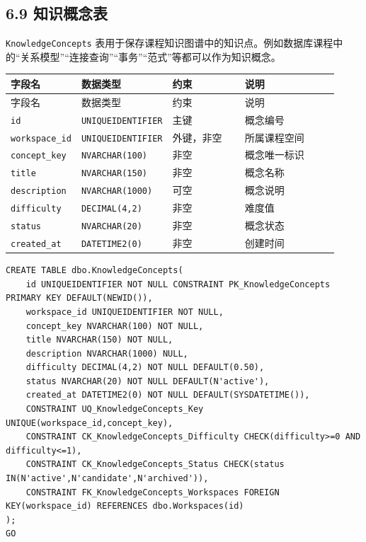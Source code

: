 \documentclass[10pt,a4paper,fontset=none]{ctexart}
\begin{document}
\subsection*{6.9 知识概念表}

\texttt{KnowledgeConcepts} 表用于保存课程知识图谱中的知识点。例如数据库课程中的“关系模型”“连接查询”“事务”“范式”等都可以作为知识概念。\par

\begingroup\scriptsize
\renewcommand{\arraystretch}{1.18}
\setlength{\LTleft}{0pt}
\setlength{\LTright}{0pt}
\begin{longtable}{>{\raggedright\arraybackslash}p{0.20\linewidth}>{\raggedright\arraybackslash}p{0.16\linewidth}>{\raggedright\arraybackslash}p{0.24\linewidth}>{\raggedright\arraybackslash}p{0.32\linewidth}}
\toprule
字段名 & 数据类型 & 约束 & 说明 \\
\midrule
\endfirsthead
\toprule
字段名 & 数据类型 & 约束 & 说明 \\
\midrule
\endhead
\texttt{id} & \texttt{UNIQUEIDENTIFIER} & 主键 & 概念编号 \\
\texttt{workspace\_id} & \texttt{UNIQUEIDENTIFIER} & 外键，非空 & 所属课程空间 \\
\texttt{concept\_key} & \texttt{NVARCHAR(100)} & 非空 & 概念唯一标识 \\
\texttt{title} & \texttt{NVARCHAR(150)} & 非空 & 概念名称 \\
\texttt{description} & \texttt{NVARCHAR(1000)} & 可空 & 概念说明 \\
\texttt{difficulty} & \texttt{DECIMAL(4,2)} & 非空 & 难度值 \\
\texttt{status} & \texttt{NVARCHAR(20)} & 非空 & 概念状态 \\
\texttt{created\_at} & \texttt{DATETIME2(0)} & 非空 & 创建时间 \\
\bottomrule
\end{longtable}
\endgroup


\begin{Verbatim}[fontsize=\scriptsize,frame=single]
CREATE TABLE dbo.KnowledgeConcepts(
    id UNIQUEIDENTIFIER NOT NULL CONSTRAINT PK_KnowledgeConcepts PRIMARY KEY DEFAULT(NEWID()),
    workspace_id UNIQUEIDENTIFIER NOT NULL,
    concept_key NVARCHAR(100) NOT NULL,
    title NVARCHAR(150) NOT NULL,
    description NVARCHAR(1000) NULL,
    difficulty DECIMAL(4,2) NOT NULL DEFAULT(0.50),
    status NVARCHAR(20) NOT NULL DEFAULT(N'active'),
    created_at DATETIME2(0) NOT NULL DEFAULT(SYSDATETIME()),
    CONSTRAINT UQ_KnowledgeConcepts_Key UNIQUE(workspace_id,concept_key),
    CONSTRAINT CK_KnowledgeConcepts_Difficulty CHECK(difficulty>=0 AND difficulty<=1),
    CONSTRAINT CK_KnowledgeConcepts_Status CHECK(status IN(N'active',N'candidate',N'archived')),
    CONSTRAINT FK_KnowledgeConcepts_Workspaces FOREIGN KEY(workspace_id) REFERENCES dbo.Workspaces(id)
);
GO
\end{Verbatim}
\end{document}
